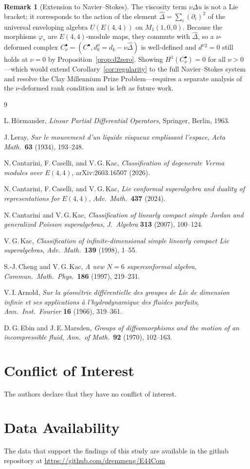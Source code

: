 \documentclass[reqno,10pt]{amsart}
\theoremstyle{definition}
\newtheorem{rem}[subsubsection]{Remark}
\begin{document}
\begin{rem}[Extension to Navier--Stokes]\label{rem:ns-extension}
The viscosity term $\nu\Delta u$ is not a Lie bracket; it corresponds to
the action of the element $\hat{\Delta} = \sum_i (\partial_i)^2$ of the
universal enveloping algebra $U(E(4,4))$ on $M_1(1,0,0)$.  Because the
morphisms $\varphi_*$ are $E(4,4)$-module maps, they commute with
$\hat{\Delta}$, so a $\nu$-deformed complex
$C^\bullet_\nu = (C^\bullet, d^\nu_k = d_k - \nu\hat{\Delta})$ is
well-defined and $d^\nu{}^2 = 0$ still holds at $\nu=0$ by
Proposition~\ref{prop:d2zero}.  Showing $H^1(C^\bullet_\nu) = 0$ for
all $\nu > 0$---which would extend Corollary~\ref{cor:regularity} to the
full Navier--Stokes system and resolve the Clay Millennium Prize
Problem---requires a separate analysis of the $\nu$-deformed rank
condition and is left as future work.
\end{rem}

\begin{thebibliography}{9}

L.\,H\"ormander,
\textit{Linear Partial Differential Operators},
Springer, Berlin, 1963.

J.\,Leray,
\textit{Sur le mouvement d'un liquide visqueux emplissant l'espace},
\textit{Acta Math.}\ \textbf{63} (1934), 193--248.

N.\,Cantarini, F.\,Caselli, and V.\,G.\,Kac,
\textit{Classification of degenerate Verma modules over $E(4,4)$},
arXiv:2603.16507 (2026).

N.\,Cantarini, F.\,Caselli, and V.\,G.\,Kac,
\textit{Lie conformal superalgebra and duality of representations for $E(4,4)$},
\textit{Adv.\ Math.}\ \textbf{437} (2024).

N.\,Cantarini and V.\,G.\,Kac,
\textit{Classification of linearly compact simple Jordan and generalized Poisson
superalgebras},
\textit{J.\ Algebra} \textbf{313} (2007), 100--124.

V.\,G.\,Kac,
\textit{Classification of infinite-dimensional simple linearly compact Lie superalgebras},
\textit{Adv.\ Math.}\ \textbf{139} (1998), 1--55.

S.-J.\,Cheng and V.\,G.\,Kac,
\textit{A new $N=6$ superconformal algebra},
\textit{Commun.\ Math.\ Phys.}\ \textbf{186} (1997), 219--231.

V.\,I.\,Arnold,
\textit{Sur la g\'eom\'etrie diff\'erentielle des groupes de Lie de dimension infinie
et ses applications à l'hydrodynamique des fluides parfaits},
\textit{Ann.\ Inst.\ Fourier} \textbf{16} (1966), 319--361.

D.\,G.\,Ebin and J.\,E.\,Marsden,
\textit{Groups of diffeomorphisms and the motion of an incompressible fluid},
\textit{Ann.\ of Math.}\ \textbf{92} (1970), 102--163.
\end{thebibliography}

\section{Conflict of Interest}
The authors declare that they have no conflict of interest.
\section{Data Availability}
The data that support the findings of this study are available in the
github repository at \url{https://github.com/dremmeng/E44Com}
\end{document}
